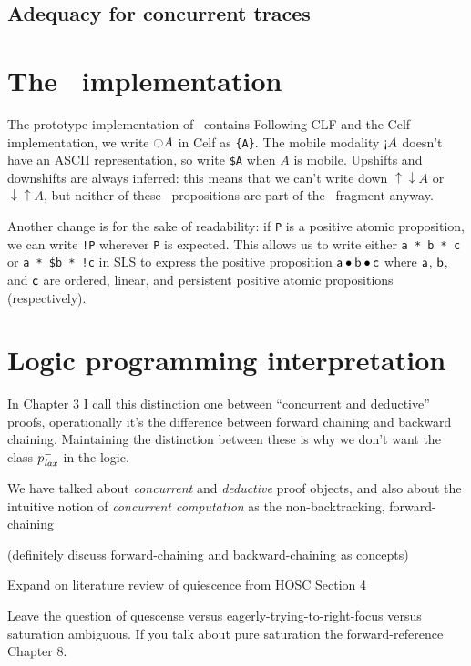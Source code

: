 \subsection{Adequacy for concurrent traces}


\section{The \sls~implementation}
\label{sec:prototype}

The prototype implementation of \sls~contains 
Following CLF and the Celf implementation, we write ${\ocircle}A$ in
Celf as \verb|{A}|. The mobile modality ${\gnab}A$ doesn't have an
ASCII representation, so write \verb|$A| when $A$ is
mobile. Upshifts and downshifts are always inferred: this means that
we can't write down ${\uparrow}{\downarrow}A$ or
${\downarrow}{\uparrow}A$, but neither of these \ollll~propositions
are part of the \sls~fragment anyway.

Another change is for the sake of readability: if \verb|P| is a
positive atomic proposition, we can write \verb|!P| wherever \verb|P|
is expected. This allows us to write either \verb|a * b * c| or
\verb|a * $b * !c| in SLS to express the positive proposition ${\sf a}
\mathbin{\bullet} {\sf b} \mathbin{\bullet} {\sf c}$ where ${\sf a}$, ${\sf b}$, and ${\sf c}$
are ordered, linear, and persistent positive atomic propositions
(respectively).

\section{Logic programming interpretation}
\label{sec:framework-logicprog}

In Chapter 3 I call this distinction one between ``concurrent and deductive''
proofs, operationally it's the difference between forward chaining 
and backward chaining. Maintaining the distinction between these is why
we don't want the class $p^-_{\it lax}$ in the logic.

We have talked about {\it concurrent} and {\it deductive} proof
objects, and also about the intuitive notion of {\it concurrent
  computation} as the non-backtracking, forward-chaining 

(definitely discuss forward-chaining and backward-chaining as concepts)

Expand on literature review of quiescence from HOSC Section 4

Leave the question of quescense versus eagerly-trying-to-right-focus
versus saturation ambiguous. If you talk about pure saturation the
forward-reference Chapter 8. 

